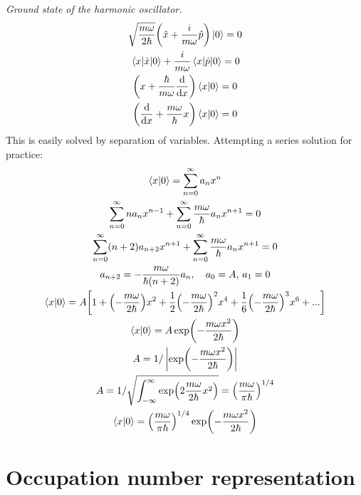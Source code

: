 \documentclass{report}
\begin{document}
\begin{subquests}
	\item \emph{Ground state of the harmonic oscillator.}
	\begin{gather*}
		\sqrt{\frac{m\omega}{2\hbar}}\pqty{\hat{x} + \frac{i}{m\omega}\hat{p}} \ket{0}= 0 \\
		\mel{x}{\hat{x}}{0} + \frac{i}{m\omega}\mel{x}{\hat{p}}{0} = 0 \\
		\pqty{x + \frac{\hbar}{m\omega}\dv{x}}\ip{x}{0} = 0 \\
		\pqty{\dv{x} + \frac{m\omega}{\hbar}x}\ip{x}{0} = 0 
	\end{gather*}
	This is easily solved by separation of variables. Attempting a series solution for practice:
	\begin{gather*}
		\ip{x}{0} = \sum_{n=0}^{\infty} a_n x^n \\
		\sum_{n=0}^{\infty}na_{n} x^{n-1} + \sum_{n=0}^{\infty}\frac{m\omega}{\hbar}a_{n}x^{n+1} = 0 \\
		\sum_{n=0}^{\infty}(n+2)a_{n+2} x^{n+1} + \sum_{n=0}^{\infty}\frac{m\omega}{\hbar}a_n x^{n+1} = 0 \\
		a_{n+2} = -\frac{m\omega}{\hbar(n+2)}a_{n},\quad a_0 = A,\, a_1 = 0 \\
		\ip{x}{0} = A\bqty{1 + \pqty{-\frac{m\omega}{2\hbar}}x^2 + \frac{1}{2}\pqty{-\frac{m\omega}{2\hbar}}^2 x^4 + \frac{1}{6}\pqty{-\frac{m\omega}{2\hbar}}^3 x^6 + ...} \\
		\ip{x}{0} = A\exp(-\frac{m\omega x^2}{2\hbar}) \\
		A = 1/\left|\exp(-\frac{m\omega x^2}{2\hbar})\right| \\
		A = 1/\sqrt{\int_{-\infty}^{\infty}\exp(2\frac{m\omega}{2\hbar}x^2)} = \pqty{\frac{m\omega}{\pi \hbar}}^{1/4}\\
		\ip{x}{0} = \pqty{\frac{m\omega}{\pi \hbar}}^{1/4}\exp(-\frac{m\omega x^2}{2\hbar})
	\end{gather*}

\end{subquests}


\chapter{Occupation number representation}
\end{document}
